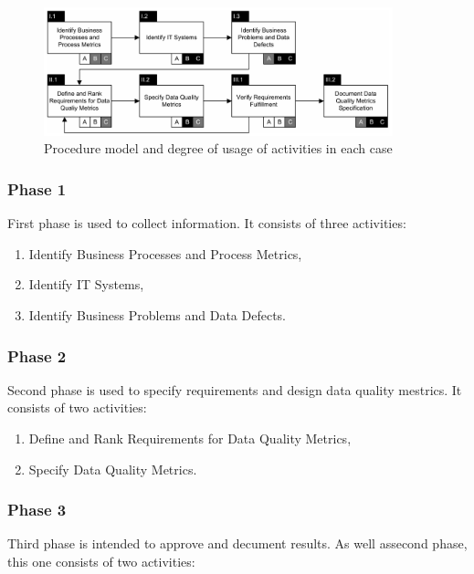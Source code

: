\begin{figure}[htb]
    \centering
    \includegraphics[width=0.9\textwidth]{figures/otto-figure-2.png}
    \caption{Procedure model and degree of usage of activities in each case~\cite{otto2011}}
    \label{fig:otto-figure-2}
\end{figure}
\FloatBarrier

\subsubsection{Phase 1}

First phase is used to collect information.
It consists of three activities:

\begin{enumerate}
    \item Identify Business Processes and Process Metrics,
    \item Identify IT Systems,
    \item Identify Business Problems and Data Defects.
\end{enumerate}

\subsubsection{Phase 2}

Second phase is used to specify requirements and design data quality mestrics.
It consists of two activities:

\begin{enumerate}
    \item Define and Rank Requirements for Data Quality Metrics,
    \item Specify Data Quality Metrics.
\end{enumerate}

\subsubsection{Phase 3}

Third phase is intended to approve and decument results.
As well assecond phase, this one consists of two activities:

